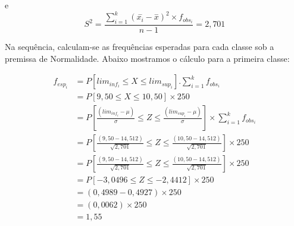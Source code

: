 \documentclass[
]{book}
\begin{document}
e\\

\[
S^{2} =    \frac{\sum_{i=1}^k (\stackrel{-}{x_{i}} -\stackrel{-}{x})^{2} \times f_{obs_{i}}}{n-1} = 2,701
\]

\hfill\break

Na sequência, calculam-se as frequências esperadas para cada classe sob a premissa de Normalidade. Abaixo mostramos o cálculo para a primeira classe:

\hfill\break

\begin{align*}
f_{esp_{i}} & = P[ lim_{inf_{i}} \le X \le lim_{sup_{i}}  ].\sum_{i=1}^{k}f_{obs_{i}} \\
 & = P[ 9,50 \le X \le 10,50  ] \times 250\\
 & = P[ \frac{(lim_{inf_{i}}-\mu)}{\sigma}  \le Z \le \frac{(lim_{sup_{i}}-\mu)}{\sigma}  ] \times \sum_{i=1}^kf_{obs_{i}}\\
 & = P[ \frac{(9,50-14,512)}{\sqrt{2,701}}  \le Z \le \frac{(10,50-14,512)}{\sqrt{2,701}}  ]\times 250\\
 & = P[ \frac{(9,50-14,512)}{\sqrt{2,701}}  \le Z \le \frac{(10,50-14,512)}{\sqrt{2,701}}  ]\times 250\\
 & = P[-3,0496  \le Z \le -2,4412  ]\times 250\\
 & = (0,4989-0,4927) \times 250\\
 & = (0,0062) \times 250\\
 & = 1,55\\
\end{align*}

\hfill\break
\end{document}
